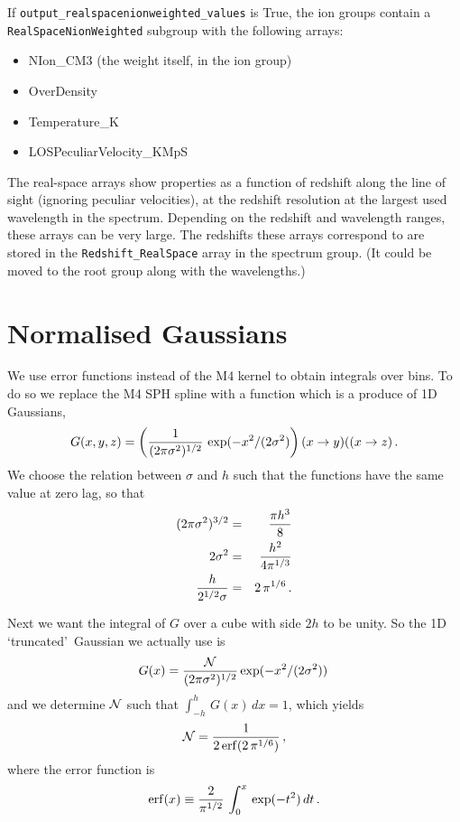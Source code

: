 \documentclass{report}
\newcommand{\param}[1]{{\tt #1}}
\begin{document}
If \param{output\_realspacenionweighted\_values} is True, the ion groups contain a \param{RealSpaceNionWeighted} subgroup with the following arrays:
\begin{itemize}
\item NIon\_CM3  (the weight itself, in the ion group)
\item OverDensity 
\item Temperature\_K
\item LOSPeculiarVelocity\_KMpS
\end{itemize}

The real-space arrays show properties as a function of redshift along the line of sight (ignoring peculiar velocities), at the redshift resolution at the largest used wavelength in the spectrum. Depending on the redshift and wavelength ranges, these arrays can be very large. The redshifts these arrays correspond to are stored in the \param{Redshift\_RealSpace} array in the spectrum group. (It could be moved to the root group along with the wavelengths.)


\section{Normalised Gaussians}
We use error functions instead of the M4 kernel to obtain integrals over bins. To do so we replace the M4 SPH spline with a function which is a produce of 1D Gaussians,
\begin{equation}
G(x,y,z) = \left({1\over (2\pi \sigma^2)^{1/2}}\,\exp(-x^2/(2\sigma^2)\right)(x\rightarrow y)((x\rightarrow z)\,.
\end{equation}
We choose the relation between $\sigma$ and $h$ such that the functions have the same value at zero lag, so that
\begin{eqnarray}
(2\pi\sigma^2)^{3/2} &=& {\pi h^3\over 8}\nonumber\\
2\sigma^2 &=& {h^2\over 4 \pi^{1/3}}\nonumber\\
{h\over 2^{1/2}\sigma} &=& 2\,\pi^{1/6}\,.
\end{eqnarray}

Next we want the integral of $G$ over a cube with side $2h$ to be unity. So the 1D \lq truncated\rq\ Gaussian we actually use is
\begin{equation}
G(x) = {{\cal N}\over (2\pi \sigma^2)^{1/2}}\exp(-x^2/(2\sigma^2))\,
\end{equation}
and we determine ${\cal N}$ such that $\int_{-h}^{h}\,G(x)\,dx=1$, which yields
\begin{equation}
{\cal N} = {1\over 2\,{\rm erf}(2\,\pi^{1/6})}\,,
\end{equation}
where the error function is
\begin{equation}
{\rm erf}(x) \equiv {2\over \pi^{1/2}}\,\int_0^x\,\exp(-t^2)\,dt\,.
\end{equation}
\end{document}
